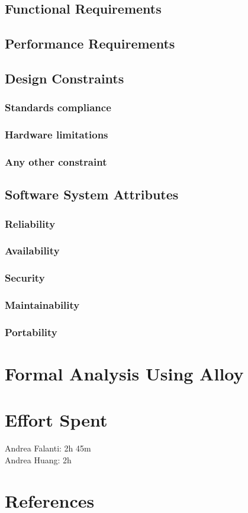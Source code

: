 \documentclass[12pt]{article}
\begin{document}
    \subsection{Functional Requirements}
    \subsection{Performance Requirements}
    \subsection{Design Constraints}
        \subsubsection{Standards compliance}
        \subsubsection{Hardware limitations}
        \subsubsection{Any other constraint}
    \subsection{Software System Attributes}
        \subsubsection{Reliability}
        \subsubsection{Availability}
        \subsubsection{Security}
        \subsubsection{Maintainability}
        \subsubsection{Portability}

\newpage
\section{Formal Analysis Using Alloy}
\section{Effort Spent}
    Andrea Falanti: 2h 45m\\
    Andrea Huang: 2h
\section{References}
\end{document}
